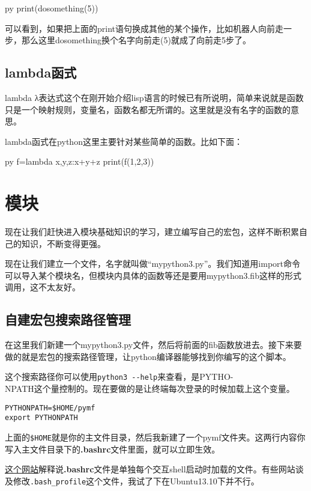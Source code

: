 \documentclass[12pt,oneside]{book}
\begin{document}
\begin{common-format}
\begin{xverbatim}[129]{py}
print(dosomething(5))
\end{xverbatim}
可以看到，如果把上面的print语句换成其他的某个操作，比如机器人向前走一步，那么这里dosomething换个名字向前走(5)就成了向前走5步了。


\section{lambda函式}
lambda
λ表达式这个在刚开始介绍lisp语言的时候已有所说明，简单来说就是函数只是一个映射规则，变量名，函数名都无所谓的。这里就是没有名字的函数的意思。

lambda函式在python这里主要针对某些简单的函数。比如下面：
\begin{xverbatim}[129]{py}
f=lambda x,y,z:x+y+z
print(f(1,2,3))
\end{xverbatim}

\chapter{模块}
现在让我们赶快进入模块基础知识的学习，建立编写自己的宏包，这样不断积累自己的知识，不断变得更强。

现在让我们建立一个文件，名字就叫做“mypython3.py”。我们知道用import命令可以导入某个模块名，但模块内具体的函数等还是要用mypython3.fib这样的形式调用，这不太友好。

\section{自建宏包搜索路径管理}
在这里我们新建一个mypython3.py文件，然后将前面的fib函数放进去。接下来要做的就是宏包的搜索路径管理，让python编译器能够找到你编写的这个脚本。

这个搜索路径你可以使用\verb+python3 --help+来查看，是PYTHO-\\NPATH这个量控制的。现在要做的是让终端每次登录的时候加载上这个变量。

\begin{Verbatim}
PYTHONPATH=$HOME/pymf
export PYTHONPATH
\end{Verbatim}
上面的\verb+$HOME+就是你的主文件目录，然后我新建了一个pymf文件夹。这两行内容你写入主文件目录下的\textbf{.bashrc}文件里面，就可以立即生效。

\href{http://stackoverflow.com/questions/415403/whats-the-difference-between-bashrc-bash-profile-and-environment}{这个网站}解释说\textbf{.bashrc}文件是单独每个交互shell启动时加载的文件。有些网站谈及修改\verb+.bash_profile+这个文件，我试了下在Ubuntu13.10下并不行。


\end{common-format}
\end{document}
